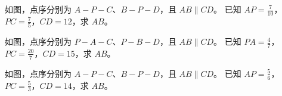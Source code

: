 \documentclass{exam-zh}
\begin{document}
\begin{problem}[points=10]
  \noindent
  \begin{minipage}[t]{\dimexpr\linewidth-60mm-6mm\relax}
    \vspace{0pt}
    如图，点序分别为 $A-P-C$、$B-P-D$，且 $AB\parallel CD$。
已知 $AP=\frac{7}{10}$，$PC=\frac{7}{5}$，$CD=12$，求 $AB$。


  \end{minipage}\hfill
  \begin{diagramcoltikz}{60mm}{本题图}
  }
  \end{diagramcoltikz}
  \par\medskip
  \answerarea[38mm]
\end{problem}



\begin{problem}[points=10]
  \noindent
  \begin{minipage}[t]{\dimexpr\linewidth-60mm-6mm\relax}
    \vspace{0pt}
    如图，点序分别为 $P-A-C$、$P-B-D$，且 $AB\parallel CD$。
已知 $PA=\frac{4}{7}$，$PC=\frac{20}{7}$，$CD=15$，求 $AB$。


  \end{minipage}\hfill
  \begin{diagramcoltikz}{60mm}{本题图}
  }
  \end{diagramcoltikz}
  \par\medskip
  \answerarea[38mm]
\end{problem}



\begin{problem}[points=10]
  \noindent
  \begin{minipage}[t]{\dimexpr\linewidth-60mm-6mm\relax}
    \vspace{0pt}
    如图，点序分别为 $A-P-C$、$B-P-D$，且 $AB\parallel CD$。
已知 $AP=\frac{5}{6}$，$PC=\frac{5}{3}$，$CD=14$，求 $AB$。


  \end{minipage}\hfill
  \begin{diagramcoltikz}{60mm}{本题图}
  }
  \end{diagramcoltikz}
  \par\medskip
  \answerarea[38mm]
\end{problem}
\end{document}
